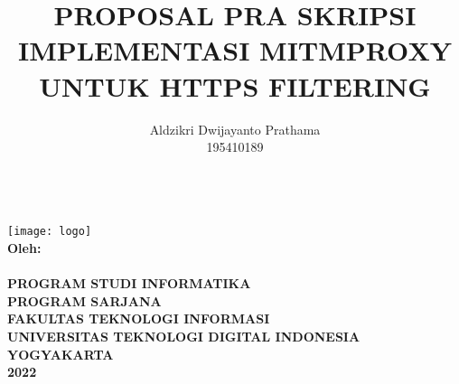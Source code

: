 \documentclass[../PROPOSAL_PRA_SKRIPSI_ALDZIKRI_DWIJAYANTO_PRATHAMA.tex]{subfiles}
\begin{document}
\title{{\large PROPOSAL PRA SKRIPSI\\
  \Large{IMPLEMENTASI MITMPROXY UNTUK HTTPS FILTERING}}}
\author{Aldzikri Dwijayanto Prathama
    \\195410189}
\makeatletter
\begin{titlepage}
    \begin{center}
        {\huge \bfseries \@title}\\[14ex]
        \texttt{[image: logo]}\\[4ex]
        {\large \bfseries Oleh:\\ \@author}\\[12ex]
        {\large \bfseries {PROGRAM STUDI INFORMATIKA\\
        PROGRAM SARJANA\\
        FAKULTAS TEKNOLOGI INFORMASI\\
        UNIVERSITAS TEKNOLOGI DIGITAL INDONESIA\\
        YOGYAKARTA\\
        2022}}
    \end{center}
\end{titlepage}
\makeatother
\end{document}
